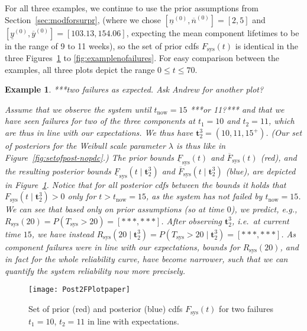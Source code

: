 \documentclass[12pt,a4paper,twocolumn,fleqn]{narms}
\renewcommand{\vec}[1]{{\bm#1}}
\newcommand{\uz}{^{(0)}} %
\newcommand{\ul}[1]{\underline{#1}}
\newcommand{\ol}[1]{\overline{#1}}
\newcommand{\Rsys}{R_\text{sys}}
\newcommand{\Fsys}{F_\text{sys}}
\newcommand{\lFsys}{\ul{F}_\text{sys}}
\newcommand{\uFsys}{\ol{F}_\text{sys}}
\def\yzl{\ul{y}\uz}
\def\yzu{\ol{y}\uz}
\def\nzl{\ul{n}\uz}
\def\nzu{\ol{n}\uz}
\newtheorem{example}{Example}
\begin{document}
For all three examples, we continue to use the prior assumptions from Section~\ref{sec:modforsurpr},
(where we chose $[\nzl, \nzu] = [2,5]$ and $[\yzl, \yzu] = [103.13, 154.06]$,
expecting the mean component lifetimes to be in the range of 9 to 11 weeks),
so the set of prior cdfs $\Fsys(t)$ is identical in the three Figures~\ref{fig:exampletwofailuresinline} to \ref{fig:examplenofailures}.
For easy comparison between the examples, all three plots depict the range $0 \leq t \leq 70$.

\begin{example}
\label{ex:1}
***two failures as expected. Ask Andrew for another plot?

Assume that we observe the system until $t_\text{now} = 15$ ***or 11?***
and that we have seen failures for two of the three components
at $t_1=10$ and $t_2=11$, which are thus in line with our expectations.
We thus have $\vec{t}_2^3 = (10, 11, 15^+)$.
(Our set of posteriors for the Weibull scale parameter $\lambda$ is thus like in Figure~\ref{fig:setofpost-nopdc}.)
The prior bounds $\lFsys(t)$ and $\uFsys(t)$ (red),
and the resulting posterior bounds $\lFsys(t \mid \vec{t}_2^3)$ and $\uFsys(t \mid \vec{t}_2^3)$ (blue),  
are depicted in Figure~\ref{fig:exampletwofailuresinline}.
Notice that for all posterior cdfs between the bounds
it holds that $\Fsys(t \mid \vec{t}_2^3) > 0$ only for $t > t_\text{now} = 15$,
as the system has not failed by $t_\text{now} = 15$.
We can see that based only on prior assumptions (so at time $0$),
we predict, e.g., $\Rsys(20) = P(T_\text{sys} > 20) = [***, ***]$.
After observing $\vec{t}_2^3$, i.e.\ at current time $15$,
we have instead $\Rsys(20 \mid \vec{t}_2^3) = P(T_\text{sys} > 20 \mid \vec{t}_2^3) = [***, ***]$.
As component failures were in line with our expectations,
bounds for $\Rsys(20)$, and in fact for the whole reliability curve, 
have become narrower,
such that we can quantify the system reliability now more precisely.
\end{example}

\begin{figure}
\texttt{[image: Post2FPlotpaper]}
\caption{Set of prior (red) and posterior (blue) cdfs $F_\text{sys}(t)$ for two failures $t_1 = 10$, $t_2 = 11$ in line with expectations.}
\label{fig:exampletwofailuresinline}
\end{figure}
\end{document}
